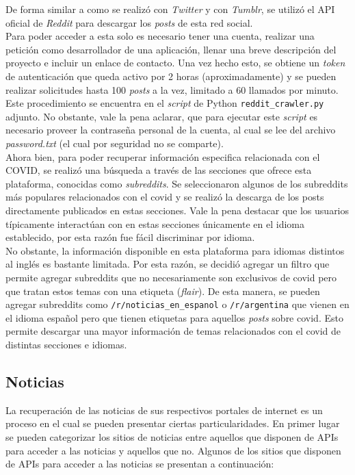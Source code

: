 De forma similar a como se realizó con \textit{Twitter} y con \textit{Tumblr}, se utilizó el API oficial de \textit{Reddit} \cite{RedditDoc} para descargar los \textit{posts} de esta red social. \\

Para poder acceder a esta solo es necesario tener una cuenta, realizar una petición como desarrollador de una aplicación, llenar una breve descripción del proyecto e incluir un enlace de contacto. Una vez hecho esto, se obtiene un \textit{token} de autenticación que queda activo por 2 horas (aproximadamente) y se pueden realizar solicitudes hasta 100 \textit{posts} a la vez, limitado a 60 llamados por minuto. Este procedimiento se encuentra en el \textit{script} de Python \texttt{reddit\_crawler.py} adjunto. No obstante, vale la pena aclarar, que para ejecutar este \textit{script} es necesario proveer la contraseña personal de la cuenta, al cual se lee  del archivo \textit{password.txt} (el cual por seguridad no se comparte).\\

Ahora bien, para poder recuperar información especifica relacionada con el COVID, se realizó una búsqueda a través de las secciones que ofrece esta plataforma, conocidas como \textit{subreddits}. Se seleccionaron algunos de los subreddits más populares relacionados con el covid y se realizó la descarga de los posts directamente publicados en estas secciones. Vale la pena destacar que los usuarios típicamente interactúan con en estas secciones únicamente en el idioma establecido, por esta razón fue fácil discriminar por idioma.\\

No obstante, la información disponible en esta plataforma para idiomas distintos al inglés es bastante limitada. Por esta razón, se decidió agregar un filtro que permite agregar subreddits que no necesariamente son exclusivos de covid pero que tratan estos temas con una etiqueta (\textit{flair}). De esta manera, se pueden agregar subreddits como \texttt{/r/noticias\_en\_espanol} o \texttt{/r/argentina} que vienen en el idioma español pero que tienen etiquetas para aquellos \textit{posts} sobre covid. Esto permite descargar una mayor información de temas relacionados con el covid de distintas secciones e idiomas.

\subsection{Noticias}
La recuperación de las noticias de sus respectivos portales de internet es un proceso en el cual se pueden presentar ciertas particularidades. En primer lugar se pueden categorizar los sitios de noticias entre aquellos que disponen de APIs para acceder a las noticias y aquellos que no. Algunos de los sitios que disponen de APIs para acceder a las noticias se presentan a continuación:

